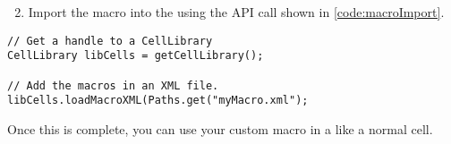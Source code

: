\begin{enumerate}
 \setcounter{enumi}{1} 
  \item Import the macro into the  using the API call shown in
  \autoref{code:macroImport}.

\end{enumerate}

\begin{lstlisting}[caption=Adding new macros to the Cell Library,
label=code:macroImport] 
// Get a handle to a CellLibrary
CellLibrary libCells = getCellLibrary();

// Add the macros in an XML file.
libCells.loadMacroXML(Paths.get("myMacro.xml"); 
\end{lstlisting}

\noindent
Once this is complete, you can use your custom macro in a  like
a normal cell.

